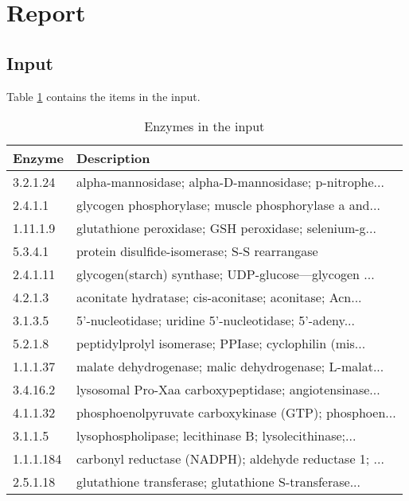 \documentclass{article}\usepackage[]{graphicx}\usepackage[]{color}
\begin{document}
\section{Report}

\subsection{Input}

Table \ref{tableInput} contains the items in the input.

\begin{table}[ht]
\centering
{\small
\begin{tabular}{ll}
  \hline
Enzyme & Description \\ 
  \hline
3.2.1.24 & alpha-mannosidase; alpha-D-mannosidase; p-nitrophe... \\ 
  2.4.1.1 & glycogen phosphorylase; muscle phosphorylase a and... \\ 
  1.11.1.9 & glutathione peroxidase; GSH peroxidase; selenium-g... \\ 
  5.3.4.1 & protein disulfide-isomerase; S-S rearrangase \\ 
  2.4.1.11 & glycogen(starch) synthase; UDP-glucose---glycogen ... \\ 
  4.2.1.3 & aconitate hydratase; cis-aconitase; aconitase; Acn... \\ 
  3.1.3.5 & 5'-nucleotidase; uridine 5'-nucleotidase; 5'-adeny... \\ 
  5.2.1.8 & peptidylprolyl isomerase; PPIase; cyclophilin (mis... \\ 
  1.1.1.37 & malate dehydrogenase; malic dehydrogenase; L-malat... \\ 
  3.4.16.2 & lysosomal Pro-Xaa carboxypeptidase; angiotensinase... \\ 
  4.1.1.32 & phosphoenolpyruvate carboxykinase (GTP); phosphoen... \\ 
  3.1.1.5 & lysophospholipase; lecithinase B; lysolecithinase;... \\ 
  1.1.1.184 & carbonyl reductase (NADPH); aldehyde reductase 1; ... \\ 
  2.5.1.18 & glutathione transferase; glutathione S-transferase... \\ 
   \hline
\end{tabular}
}
\caption{Enzymes in the input} 
\label{tableInput}
\end{table}
\end{document}
